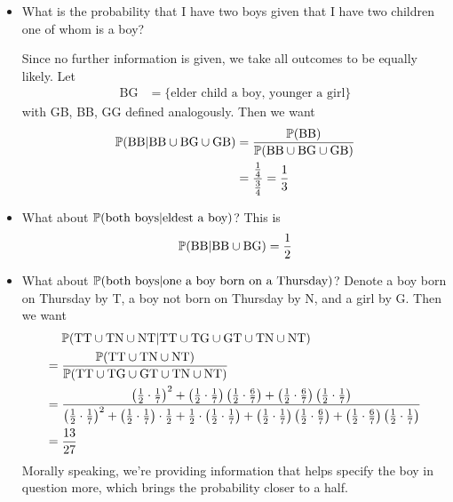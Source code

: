 \documentclass{../template/note}
\begin{document}
    
    \begin{example*}
        \begin{itemize}
            \item What is the probability that I have two boys given that I have two children one of whom is a boy?
            
            Since no further information is given, we take all outcomes to be equally likely. Let
            \begin{align*}
                \text{BG} &= \{\text{elder child a boy, younger a girl}\}
            \end{align*}
            with GB, BB, GG defined analogously. Then we want
            \begin{align*}
                \mathbb P(\text{BB} |  \text{BB} \cup \text{BG} \cup \text{GB}) &= \frac{\mathbb P(\text{BB})}{\mathbb P(\text{BB} \cup \text{BG} \cup \text{GB})} \\
                &= \frac{\frac 1 4}{\frac 3 4} = \frac 1 3 
            \end{align*}
            \item What about \(\mathbb P(\text{both boys} | \text{eldest a boy})\)? This is
            \begin{align*}
                \mathbb P(\text{BB} |  \text{BB} \cup \text{BG}) = \frac 1 2
            \end{align*}
            \item What about \(\mathbb P(\text{both boys} | \text{one a boy born on a Thursday})\)?
            Denote a boy born on Thursday by T, a boy not born on Thursday by N, and a girl by G. Then we want
            \begin{align*}
                &\; \mathbb P(\text{TT} \cup \text{TN} \cup \text{NT} | \text{TT} \cup \text{TG} \cup \text{GT} \cup \text{TN} \cup \text{NT}) \\
                =&\; \frac{\mathbb P(\text{TT} \cup \text{TN} \cup \text{NT})}{\mathbb P(\text{TT} \cup \text{TG} \cup \text{GT} \cup \text{TN} \cup \text{NT})} \\
                =&\; \frac{\left(\frac 1 2 \cdot \frac 1 7\right)^2 + \left(\frac 1 2 \cdot \frac 1 7\right)\left(\frac 1 2 \cdot \frac 6 7\right) + \left(\frac 1 2 \cdot \frac 6 7\right)\left(\frac 1 2 \cdot \frac 1 7\right)}{\left(\frac 1 2 \cdot \frac 1 7\right)^2 + \left(\frac 1 2 \cdot \frac 1 7\right)\cdot \frac 1 2 + \frac 1 2 \cdot \left(\frac 1 2 \cdot \frac 1 7\right) + \left(\frac 1 2 \cdot \frac 1 7\right)\left(\frac 1 2 \cdot \frac 6 7\right) + \left(\frac 1 2 \cdot \frac 6 7\right)\left(\frac 1 2 \cdot \frac 1 7\right)} \\
                =&\; \frac{13}{27}
            \end{align*}
            Morally speaking, we're providing information that helps specify the boy in question more, which brings the probability closer to a half.
        \end{itemize}
    \end{example*}
    
\end{document}
